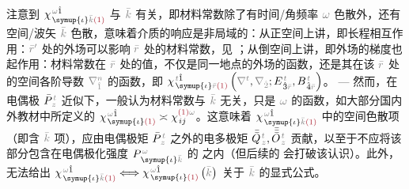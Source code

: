 注意到 $\chi^{\;\! \mathcolor{gray}{\omega} \hat{1}}_{\;\! \symup{\iota} \mathcolor{gray}{\bar{k}} \textcolor{Maroon}{(1)}}$ 与 $\mathcolor{gray}{\bar{k}}$ 有关，即材料常数除了有时间/角频率 $\mathcolor{gray}{\omega}$ 色散外，还有空间/波矢 $\mathcolor{gray}{\bar{k}}$ 色散，意味着介质的响应是非局域的：从正空间上讲，即长程相互作用：$\mathcolor{gray}{\bar{r}'}$ 处的外场可以影响 $\mathcolor{gray}{\bar{r}}$ 处的材料常数，见 ；从倒空间上讲，即外场的梯度也起作用：材料常数在 $\mathcolor{gray}{\bar{r}}$ 处的值，不仅是同一地点的外场的函数，还是其在该 $\mathcolor{gray}{\bar{r}}$ 处的空间各阶导数 $\mathcolor{gray}{\nabla^n_{\hat{1}}}$ 的函数，即 $\chi^{\;\! \mathcolor{gray}{t} \hat{1}}_{\;\! \symup{\iota} \mathcolor{gray}{\bar{r}} \textcolor{Maroon}{(1)}} \left( \mathcolor{gray}{\nabla^t}, \mathcolor{gray}{\nabla_{\hat{2}}} ; E^{\;\!\mathcolor{gray}{t}}_{\;\! \hat{3}\mathcolor{gray}{\bar{r}}}, B^{\;\!\mathcolor{gray}{t}}_{\;\! \hat{4}\mathcolor{gray}{\bar{r}}} \right)$。 ---  然而，在电偶极 $\bar{P}^{\;\!\mathcolor{gray}{t}}_{\;\!\mathcolor{gray}{z}}$ 近似下，一般认为材料常数与 $\mathcolor{gray}{\bar{k}}$ 无关，只是 $\mathcolor{gray}{\omega}$ 的函数，如大部分国内外教材中所定义的 $\chi^{\;\! \mathcolor{gray}{\omega} \hat{1}}_{\;\! \symup{\iota} \textcolor{Maroon}{(1)}} \asymp \chi^{ \textcolor{Maroon}{(1)} \mathcolor{gray}{\omega}}_{\;\! ij}$。这意味着 $\chi^{\;\! \mathcolor{gray}{\omega} \hat{1}}_{\;\! \symup{\iota} \mathcolor{gray}{\bar{k}} \textcolor{Maroon}{(1)}}$ 中的空间色散项（即含 $\mathcolor{gray}{\bar{k}}$ 项），应由电偶极矩 $\bar{P}^{\;\!\mathcolor{gray}{t}}_{\;\!\mathcolor{gray}{z}}$ 之外的电多极矩 $\bar{\bar{Q}}^{\;\!\mathcolor{gray}{t}}_{\;\!\mathcolor{gray}{z}},\bar{\bar{\bar{O}}}^{\;\!\mathcolor{gray}{t}}_{\;\!\mathcolor{gray}{z}}$ 贡献\cite{shenNonlinearOpticalSusceptibilities2001}，以至于不应将该部分包含在电偶极化强度 $P^{\;\!\mathcolor{gray}{\omega}}_{\;\! \symup{\iota}\mathcolor{gray}{\bar{k}}}$ 的  之内（但后续的  会打破该认识）。此外， 无法给出 $\chi^{\;\! \mathcolor{gray}{\omega} \hat{1}}_{\;\! \symup{\iota} \mathcolor{gray}{\bar{k}} \textcolor{Maroon}{(1)}} \Longleftrightarrow \chi^{\;\! \mathcolor{gray}{\omega} \hat{1}}_{\;\! \symup{\iota} \textcolor{Maroon}{(1)}} \left( \mathcolor{gray}{\bar{k}} \right)$ 关于 $\mathcolor{gray}{\bar{k}}$ 的显式公式。

